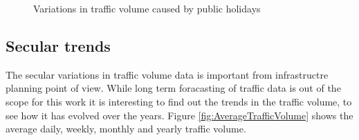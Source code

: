\begin{figure}[h]

    \caption[Impact of public holidays on traffic volume]{Variations in traffic volume caused by
     public holidays}
   \label{fig:Holidays}
\end{figure}

\subsection{Secular trends}
The secular variations in traffic volume data is important from infrastructre planning point of
view. While long term foracasting of traffic data is out of the scope for this work it is interesting
to find out the trends in the traffic volume, to see how it has evolved over the years.
Figure \ref{fig:AverageTrafficVolume} shows the average daily, weekly, monthly and yearly traffic
volume.

